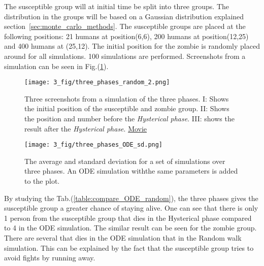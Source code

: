 \documentclass[%
twoside,                 %
final,                   %
chapterprefix=true,      %
open=right               %
10pt]{book}
\begin{document}
\vspace{3mm}




\vspace{3mm}


The susceptible group will at initial time be split into three groups. The distribution in the groups will be based on a Gaussian distribution explained section~\ref{sec:monte_carlo_methods}. The susceptible groups are placed at the following positions: 21 humans at position(6,6), 200 humans at position(12,25) and 400 humans at (25,12). The initial position for the zombie is randomly placed around for all simulations. 100 simulations are performed. Screenshots from a simulation can be seen in Fig.(\ref{fig:screenshots_three_phases}). 


\vspace{3mm}




\vspace{3mm}




\begin{figure}[ht]
  \centerline{\texttt{[image: 3\_fig/three\_phases\_random\_2.png]}}
  \caption{
  \label{fig:screenshots_three_phases} Three screenshots from a simulation of the three phases. I: Shows the initial position of the susceptible and zombie group. II: Shows the position and number before the \emph{Hysterical phase}. III: shows the result after the \emph{Hysterical phase}. \href{{https://torbjornseland.github.io/master}}{Movie}
  }
\end{figure}





\begin{figure}[ht]
  \centerline{\texttt{[image: 3\_fig/three\_phases\_ODE\_sd.png]}}
  \caption{
  The average and standard deviation for a set of simulations over three phases. An ODE simulation withthe same parameters is added to the plot.
  }
\end{figure}



By studying the Tab.(\ref{table:compare_ODE_random}), the three phases gives the susceptible group a greater chance of staying alive. One can see that there is only 1 person from the susceptible group that dies in the Hysterical phase compared to 4 in the ODE simulation. The similar result can be seen for the zombie group. There are several that dies in the ODE simulation that in the Random walk simulation. This can be explained by the fact that the susceptible group tries to avoid fights by running away. 
\end{document}

